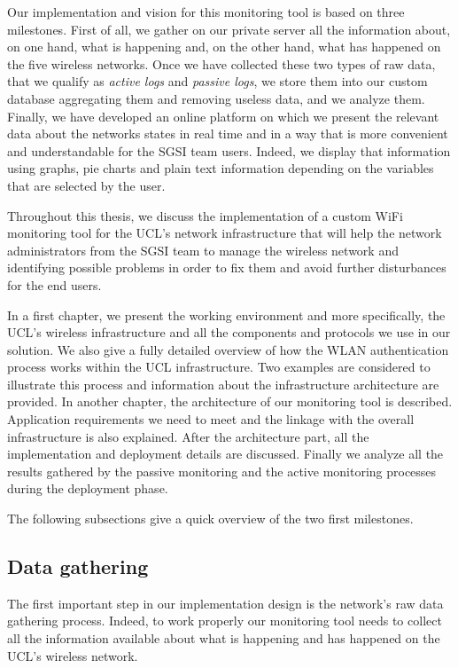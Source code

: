 Our implementation and vision for this monitoring tool is based on three milestones. First of all, we gather on our private server all the information about, on one hand, what is happening and, on the other hand, what has happened on the five wireless networks. Once we have collected these two types of raw data, that we qualify as \textit{active logs} and \textit{passive logs}, we store them into our custom database aggregating them and removing useless data, and we analyze them. Finally, we have developed an online platform on which we present the relevant data about the networks states in real time and in a way that is more convenient and understandable for the SGSI team users. Indeed, we display that information using graphs, pie charts and plain text information depending on the variables that are selected by the user.

Throughout this thesis, we discuss the implementation of a custom WiFi monitoring tool for the UCL's network infrastructure that will help the network administrators from the SGSI team to manage the wireless network and identifying possible problems in order to fix them and avoid further disturbances for the end users. 


In a first chapter, we present the working environment and more specifically, the UCL's wireless infrastructure and all the components and protocols we use in our solution. We also give a fully detailed overview of how the WLAN authentication process works within the UCL infrastructure. Two examples are considered to illustrate this process and information about the infrastructure architecture are provided. In another chapter, the architecture of our monitoring tool is described. Application requirements we need to meet and the linkage with the overall infrastructure is also explained. After the architecture part, all the implementation and deployment details are discussed. Finally we analyze all the results gathered by the passive monitoring and the active monitoring processes during the deployment phase. 


The following subsections give a quick overview of the two first milestones.


\subsection{Data gathering}
The first important step in our implementation design is the network's raw data gathering process. Indeed, to work properly our monitoring tool needs to collect all the information available about what is happening and has happened on the UCL's wireless network.

